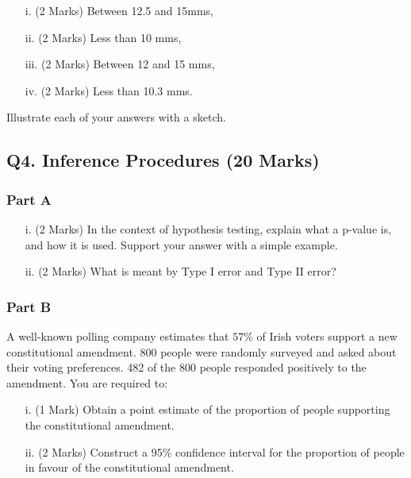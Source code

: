 \documentclass[a4paper,12pt]{article}
\begin{document}
\begin{itemize}
\item [i.](2 Marks)	Between 12.5 and 15mms,
\item [ii.](2 Marks) Less than 10 mms,
\item [iii.](2 Marks) Between 12 and 15 mms,
\item [iv.](2 Marks) Less than 10.3 mms.
\end{itemize}
\noindent Illustrate each of your answers with a sketch.
\newpage


\subsection*{Q4. Inference Procedures (20 Marks)}

\subsubsection*{Part A} %
\begin{itemize}
\item[i.](2 Marks) In the context of hypothesis testing, explain what a p-value is, and how it is used. Support your answer with a simple example.
\item[ii.](2 Marks) What is meant by Type I error and Type II error?
\end{itemize}
\subsubsection*{Part B} %
A well-known polling company estimates that $57\%$ of Irish voters support a new constitutional amendment. 800 people were randomly surveyed and asked about their voting preferences. 482 of the 800 people responded positively to the amendment. You are required to:

\begin{itemize}
\item [i.](1 Mark) Obtain a point estimate of the proportion of people supporting the constitutional amendment.
\item [ii.](2 Marks) Construct a 95\% confidence interval for the proportion of people in favour of the constitutional amendment.
\end{itemize}
\end{document}
